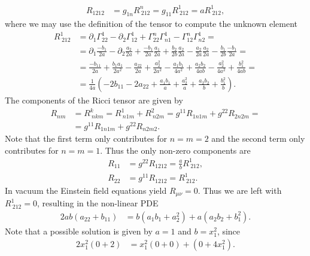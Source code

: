 \documentclass[english, parskip=full]{scrartcl}
\newcommand{\kla}{}
\begin{document}
\begin{align}
R_{1212} &= g_{1n} R^n_{\ 212} = g_{11} R^{1}_{\ 212} = aR^1_{\ 212},
\end{align}
where we may use the definition of the tensor to compute the unknown element
\begin{align}
R^1_{\ 212} &= \partial_1\Gamma^1_{22} - \partial_2\Gamma^1_{12} + \Gamma^n_{22}\Gamma^1_{n1} - \Gamma^n_{12}\Gamma^1_{n2} = \\
&= \partial_1 \frac{-b_1}{2a} - \partial_2 \frac{a_2}{2a} + \frac{-b_1}{2a} \frac{a_1}{2a} + \frac{b_2}{2b} \frac{a_2}{2a} - \frac{a_2}{2a} \frac{a_2}{2a} - \frac{b_1}{2b} \frac{-b_1}{2a} = \\
&= \frac{-b_{11}}{2a} + \frac{b_1a_1}{2a^2} - \frac{a_{22}}{2a} + \frac{a_2^2}{2a^2} - \frac{a_1b_1}{4a^2} + \frac{a_2b_2}{4ab} - \frac{a_2^2}{4a^2} + \frac{b_1^2}{4ab} = \\
&= \frac{1}{4a} \kla\left( -2b_{11} - 2a_{22} + \frac{a_1b_1}{a} + \frac{a_2^2}{a} + \frac{a_2b_2}{b} + \frac{b_1^2}{b} \right).
\end{align}
The components of the Ricci tensor are given by
\begin{align}
R_{nm} &= R^{k}_{\ nkm} = R^1_{\ n1m} + R^2_{\ n2m} = g^{11} R_{1n1m} + g^{22} R_{2n2m} = \\
&= g^{11} R_{1n1m} + g^{22} R_{n2m2}.
\end{align}
Note that the first term only contributes for $n=m=2$ and the second term only contributes for $n=m=1$.
Thus the only non-zero components are
\begin{align}
R_{11} &= g^{22} R_{1212} = \frac{a}{b} R^1_{\ 212} ,\\
R_{22} &= g^{11} R_{1212} = R^1_{\ 212}.
\end{align}
In vacuum the Einstein field equations yield $R_{\mu\nu} = 0$.
Thus we are left with $R^1_{\ 212} = 0$, resulting in the non-linear PDE
\begin{align}
2ab (a_{22} + b_{11}) &= b(a_1b_1 + a_2^2) + a(a_2b_2 + b_1^2).
\end{align}
Note that a possible solution is given by $a=1$ and $b=x_1^2$, since
\begin{align}
2x_1^2 (0 + 2) &= x_1^2 (0 + 0) + (0 + 4x_1^2).
\end{align}
\end{document}
